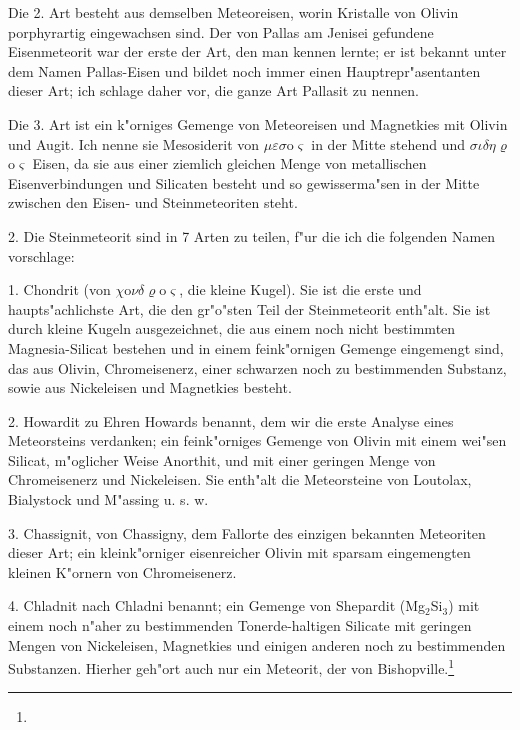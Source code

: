 \documentclass[a4paper, 11pt, oneside]{article}
\begin{document}
Die 2. Art besteht aus demselben Meteoreisen, worin Kristalle von Olivin porphyrartig eingewachsen sind. Der von Pallas am Jenisei gefundene Eisenmeteorit war der erste der Art, den man kennen lernte; er ist bekannt unter dem Namen Pallas-Eisen und bildet noch immer einen Hauptrepr"asentanten dieser Art; ich schlage daher vor, die ganze Art Pallasit zu nennen.

Die 3. Art ist ein k"orniges Gemenge von Meteoreisen und Magnetkies mit Olivin und Augit. Ich nenne sie Mesosiderit von $\mu\varepsilon\sigma$o$\varsigma$ in der Mitte stehend und $\sigma\iota\delta\eta\varrho$o$\varsigma$ Eisen, da sie aus einer ziemlich gleichen Menge von metallischen Eisenverbindungen und Silicaten besteht und so gewisserma"sen in der Mitte zwischen den Eisen- und Steinmeteoriten steht.

2. Die Steinmeteorit sind in 7 Arten zu teilen, f"ur die ich die folgenden Namen vorschlage:

1. Chondrit (von $\chi$o$\nu\delta\varrho$o$\varsigma$, die kleine Kugel). Sie ist die erste und haupts"achlichste Art, die den gr"o"sten Teil der Steinmeteorit enth"alt. Sie ist durch kleine Kugeln ausgezeichnet, die aus einem noch nicht bestimmten Magnesia-Silicat bestehen und in einem feink"ornigen Gemenge eingemengt sind, das aus Olivin, Chromeisenerz, einer schwarzen noch zu bestimmenden Substanz, sowie aus Nickeleisen und Magnetkies besteht.

2. Howardit zu Ehren Howards benannt, dem wir die erste Analyse eines Meteorsteins verdanken; ein feink"orniges Gemenge von Olivin mit einem wei"sen Silicat, m"oglicher Weise Anorthit, und mit einer geringen Menge von Chromeisenerz und Nickeleisen. Sie enth"alt die Meteorsteine von Loutolax, Bialystock und M"assing u. s. w.

3. Chassignit, von Chassigny, dem Fallorte des einzigen bekannten Meteoriten dieser Art; ein kleink"orniger eisenreicher Olivin mit sparsam eingemengten kleinen K"ornern von Chromeisenerz.

4. Chladnit nach Chladni benannt; ein Gemenge von Shepardit (Mg$_{2}$Si$_{3}$) mit einem noch n"aher zu bestimmenden Tonerde-haltigen Silicate mit geringen Mengen von Nickeleisen, Magnetkies und einigen anderen noch zu bestimmenden Substanzen. Hierher geh"ort auch nur ein Meteorit, der von Bishopville.\footnote{}
\end{document}
